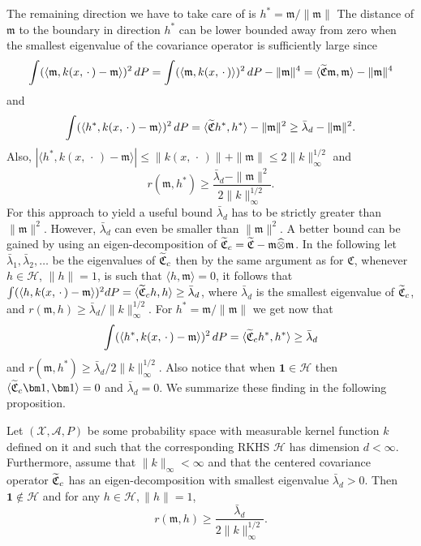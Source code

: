 \documentclass[AHL,Unicode,longabstracts,published]{cedram}
\theoremstyle{remark}
\newcommand{\X}{\mathcal{X}}
\newcommand{\clA}{\mathcal{A}}
\newcommand{\cH}{\mathcal{H}}
\newcommand{\fkC}{\mathfrak{C}}
\newcommand{\mean}{\mathfrak{m}}
\let\oldtilde\tilde
\renewcommand*{\tilde}[1]{\mathchoice{\widetilde{#1}}{\widetilde{#1}}{\oldtilde{#1}}{\oldtilde{#1}}}
\begin{document}
The remaining direction we have to take care of is $h^* = \mean/\|\mean\|$ The distance of $\mean$ to the boundary in direction $h^*$ can be lower bounded away from zero when the smallest eigenvalue of the covariance operator is sufficiently large since
\[
\int (\langle \mean,k(x,\,\cdot\,) - \mean \rangle)^2 \,dP = \int (\langle \mean, k(x,\,\cdot\,)
\rangle)^2 \,dP - \|\mean\|^4 = \langle \tilde{\fkC} \mean,\mean \rangle - \|\mean\|^4
\]
and
\[
\int (\langle h^*,k(x,\,\cdot\,) - \mean \rangle)^2 \,dP = \langle \tilde{\fkC} h^*,h^* \rangle - \|\mean\|^2 \geq \bar \lambda_d - \|\mean\|^2.
\]
Also, $|\langle h^*,k(x,\,\cdot\,) - \mean \rangle|
\leq \|k(x,\,\cdot\,)\| + \|\mean\| \leq 2 \|k\|_\infty^{1/2}$ and
\[
r(\mean,h^*) \geq \frac{\bar{\lambda}_d- \|\mean\|^2}{2\|k\|_\infty^{1/2}}.
\]
For this approach to yield a useful bound $\bar \lambda_d$ has to be strictly greater than $\|\mean\|^2$. However, $\bar \lambda_d$ can even be smaller than $\|\mean\|^2$. A better bound can be gained by using an eigen-decomposition of $\tilde{\fkC}_c = \tilde{\fkC} - \mean \widehat{\otimes} \mean$. In the following let $\bar \lambda_1, \bar \lambda_2, \dots$ be the eigenvalues of $ \tilde{\fkC}_c$ then by the same argument as for $\fkC$, whenever $h \in \cH$, $\|h\|=1$, is such that $\langle h, \mean \rangle = 0$, it follows that $\int (\langle h, k(x,\,\cdot\,) - \mean \rangle)^2 dP = \langle \tilde{\fkC}_c h, h \rangle \geq \bar \lambda_d$, where $\bar \lambda_d$ is the smallest eigenvalue of $ \tilde{\fkC}_c$, and $r(\mean,h) \geq \bar \lambda_d/\|k\|_\infty^{1/2}$. For $h^* = \mean/\|\mean\|$ we get now that
\[
\int (\langle h^*,k(x,\,\cdot\,) - \mean \rangle)^2 \,dP =
\langle \tilde{\fkC}_c h^*,h^* \rangle \geq \bar \lambda_d
\]
and $r(\mean,h^*) \geq \bar \lambda_d/2\|k\|_\infty^{1/2}$. Also notice that when $\bm 1 \in \cH$ then $\langle \tilde{\fkC}_c \bm 1,\bm 1 \rangle = 0$ and $\bar \lambda_d = 0$. We summarize these finding in the following proposition.

\begin{prop}\label{prop:cov_bound_radius}
Let $(\X,\clA,P)$ be some probability space with measurable kernel function $k$ defined on it and such that the corresponding RKHS $\cH$ has dimension $d<\infty$. Furthermore, assume that $\|k\|_\infty < \infty$ and that the centered covariance operator $\tilde{\fkC}_c$ has an eigen-decomposition with smallest eigenvalue $\bar \lambda_d > 0$. Then $\bm 1 \not \in \cH$ and for any $h\in \cH, \|h\| =1$,
\[
r(\mean,h) \geq \frac{\bar \lambda_d}{2\|k\|_\infty^{1/2}}.
\]
\end{prop}
\end{document}
